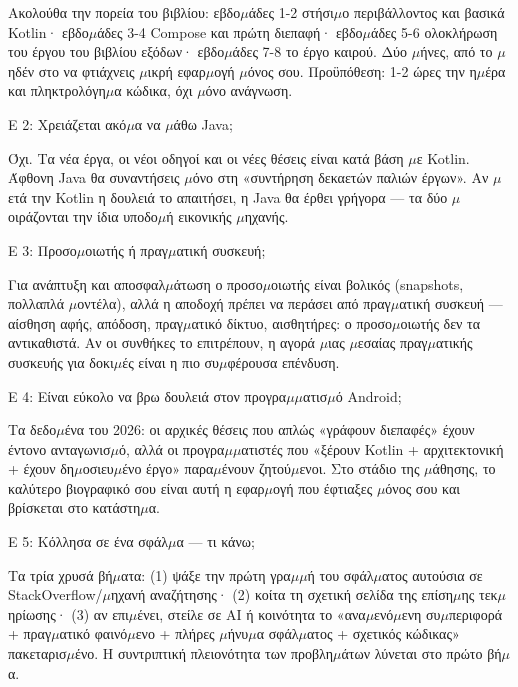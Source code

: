 Ακολούθα την πορεία του βιβλίου: εβδο$\mu$άδες 1-2 στήσι$\mu$ο περιβάλλοντος και βασικά Kotlin· εβδο$\mu$άδες 3-4 Compose και πρώτη διεπαφή· εβδο$\mu$άδες 5-6 ολοκλήρωση του έργου του βιβλίου εξόδων· εβδο$\mu$άδες 7-8 το έργο καιρού. Δύο $\mu$ήνες, από το $\mu$ηδέν στο να φτιάχνεις $\mu$ικρή εφαρ$\mu$ογή $\mu$όνος σου. Προϋπόθεση: 1-2 ώρες την η$\mu$έρα και πληκτρολόγη$\mu$α κώδικα, όχι $\mu$όνο ανάγνωση.

Ε 2: Χρειάζεται ακό$\mu$α να $\mu$άθω Java;

Όχι. Τα νέα έργα, οι νέοι οδηγοί και οι νέες θέσεις είναι κατά βάση $\mu$ε Kotlin. Άφθονη Java θα συναντήσεις $\mu$όνο στη «συντήρηση δεκαετών παλιών έργων». Αν $\mu$ετά την Kotlin η δουλειά το απαιτήσει, η Java θα έρθει γρήγορα — τα δύο $\mu$οιράζονται την ίδια υποδο$\mu$ή εικονικής $\mu$ηχανής.

Ε 3: Προσο$\mu$οιωτής ή πραγ$\mu$ατική συσκευή;

Για ανάπτυξη και αποσφαλ$\mu$άτωση ο προσο$\mu$οιωτής είναι βολικός (snapshots, πολλαπλά $\mu$οντέλα), αλλά η αποδοχή πρέπει να περάσει από πραγ$\mu$ατική συσκευή — αίσθηση αφής, απόδοση, πραγ$\mu$ατικό δίκτυο, αισθητήρες: ο προσο$\mu$οιωτής δεν τα αντικαθιστά. Αν οι συνθήκες το επιτρέπουν, η αγορά $\mu$ιας $\mu$εσαίας πραγ$\mu$ατικής συσκευής για δοκι$\mu$ές είναι η πιο συ$\mu$φέρουσα επένδυση.

Ε 4: Είναι εύκολο να βρω δουλειά στον προγρα$\mu$$\mu$ατισ$\mu$ό Android;

Τα δεδο$\mu$ένα του 2026: οι αρχικές θέσεις που απλώς «γράφουν διεπαφές» έχουν έντονο ανταγωνισ$\mu$ό, αλλά οι προγρα$\mu$$\mu$ατιστές που «ξέρουν Kotlin + αρχιτεκτονική + έχουν δη$\mu$οσιευ$\mu$ένο έργο» παρα$\mu$ένουν ζητού$\mu$ενοι. Στο στάδιο της $\mu$άθησης, το καλύτερο βιογραφικό σου είναι αυτή η εφαρ$\mu$ογή που έφτιαξες $\mu$όνος σου και βρίσκεται στο κατάστη$\mu$α.

Ε 5: Κόλλησα σε ένα σφάλ$\mu$α — τι κάνω;

Τα τρία χρυσά βή$\mu$ατα: (1) ψάξε την πρώτη γρα$\mu$$\mu$ή του σφάλ$\mu$ατος αυτούσια σε StackOverflow/$\mu$ηχανή αναζήτησης· (2) κοίτα τη σχετική σελίδα της επίση$\mu$ης τεκ$\mu$ηρίωσης· (3) αν επι$\mu$ένει, στείλε σε AI ή κοινότητα το «ανα$\mu$ενό$\mu$ενη συ$\mu$περιφορά + πραγ$\mu$ατικό φαινό$\mu$ενο + πλήρες $\mu$ήνυ$\mu$α σφάλ$\mu$ατος + σχετικός κώδικας» πακεταρισ$\mu$ένο. Η συντριπτική πλειονότητα των προβλη$\mu$άτων λύνεται στο πρώτο βή$\mu$α.


